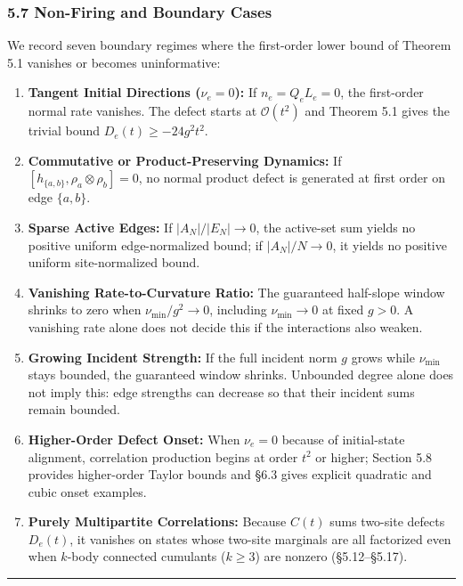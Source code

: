\documentclass[
  11pt,
]{article}
\providecommand{\tightlist}{%
  \setlength{\itemsep}{0pt}\setlength{\parskip}{0pt}}
\providecommand{\tightlist}{%
  \setlength{\itemsep}{0pt}\setlength{\parskip}{0pt}}
\begin{document}
\subsubsection{5.7 Non-Firing and Boundary Cases}\label{non-firing-and-boundary-cases}

We record seven boundary regimes where the first-order lower bound of Theorem 5.1 vanishes or becomes uninformative:

\begin{enumerate}
\def\labelenumi{\arabic{enumi}.}
\tightlist
\item
  \textbf{Tangent Initial Directions (\(\nu_e = 0\)):} If \(n_e=Q_eL_e=0\), the first-order normal rate vanishes. The defect starts at \(\mathcal{O}(t^2)\) and Theorem 5.1 gives the trivial bound \(D_e(t) \ge -24g^2 t^2\).
\item
  \textbf{Commutative or Product-Preserving Dynamics:} If \([h_{\{a,b\}}, \rho_a \otimes \rho_b] = 0\), no normal product defect is generated at first order on edge \(\{a,b\}\).
\item
  \textbf{Sparse Active Edges:} If \(|A_N|/|E_N| \to 0\), the active-set sum yields no positive uniform edge-normalized bound; if \(|A_N|/N \to 0\), it yields no positive uniform site-normalized bound.
\item
  \textbf{Vanishing Rate-to-Curvature Ratio:} The guaranteed half-slope window shrinks to zero when \(\nu_{\min}/g^2\to0\), including \(\nu_{\min}\to0\) at fixed \(g>0\). A vanishing rate alone does not decide this if the interactions also weaken.
\item
  \textbf{Growing Incident Strength:} If the full incident norm \(g\) grows while \(\nu_{\min}\) stays bounded, the guaranteed window shrinks. Unbounded degree alone does not imply this: edge strengths can decrease so that their incident sums remain bounded.
\item
  \textbf{Higher-Order Defect Onset:} When \(\nu_e=0\) because of initial-state alignment, correlation production begins at order \(t^2\) or higher; Section 5.8 provides higher-order Taylor bounds and §6.3 gives explicit quadratic and cubic onset examples.
\item
  \textbf{Purely Multipartite Correlations:} Because \(C(t)\) sums two-site defects \(D_e(t)\), it vanishes on states whose two-site marginals are all factorized even when \(k\)-body connected cumulants (\(k\ge 3\)) are nonzero (§5.12--§5.17).
\end{enumerate}

\begin{center}\rule{0.5\linewidth}{0.5pt}\end{center}
\end{document}
